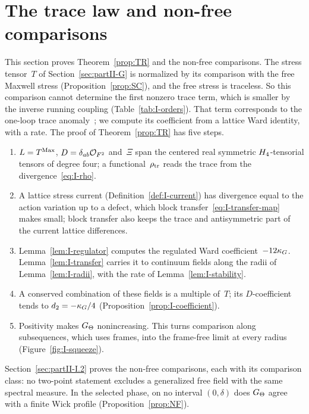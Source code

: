 \section{The trace law and non-free comparisons}\label{sec:partII-I}

This section proves Theorem~\ref{prop:TR} and the non-free comparisons. The stress tensor~$T$ of Section~\ref{sec:partII-G} is normalized by its comparison with the free Maxwell stress (Proposition~\ref{prop:SC}), and the free stress is traceless. So this comparison cannot determine the first nonzero trace term, which is smaller by the inverse running coupling (Table~\ref{tab:I-orders}). That term corresponds to the one-loop trace anomaly~\cite{CollinsDuncanJoglekar1977}; we compute its coefficient from a lattice Ward identity, with a rate. The proof of Theorem~\ref{prop:TR} has five steps.
\begin{enumerate}[label=(\arabic*),itemsep=0pt]
\item $L=T^{\mathrm{Max}}$, $D=\delta_{ab}\mathcal{O}_{F^2}$ and~$\Xi$ span the centered real symmetric $H_4$-tensorial tensors of degree four; a functional~$\rho_{\rm tr}$ reads the trace from the divergence~\eqref{eq:I-rho}.
\item A lattice stress current (Definition~\ref{def:I-current}) has divergence equal to the action variation up to a defect, which block transfer~\eqref{eq:I-transfer-map} makes small; block transfer also keeps the trace and antisymmetric part of the current lattice differences.
\item Lemma~\ref{lem:I-regulator} computes the regulated Ward coefficient~$-12\kappa_G$. Lemma~\ref{lem:I-transfer} carries it to continuum fields along the radii of Lemma~\ref{lem:I-radii}, with the rate of Lemma~\ref{lem:I-stability}.
\item A conserved combination of these fields is a multiple of~$T$; its $D$-coefficient tends to $d_2=-\kappa_G/4$ (Proposition~\ref{prop:I-coefficient}).
\item Positivity makes $G_{\Theta}$ nonincreasing. This turns comparison along subsequences, which uses frames, into the frame-free limit at every radius (Figure~\ref{fig:I-squeeze}).
\end{enumerate}
Section~\ref{sec:partII-I.2} proves the non-free comparisons, each with its comparison class: no two-point statement excludes a generalized free field with the same spectral measure. In the selected phase, on no interval $(0,\delta)$ does $G_{\Theta}$ agree with a finite Wick profile (Proposition~\ref{prop:NF}).

